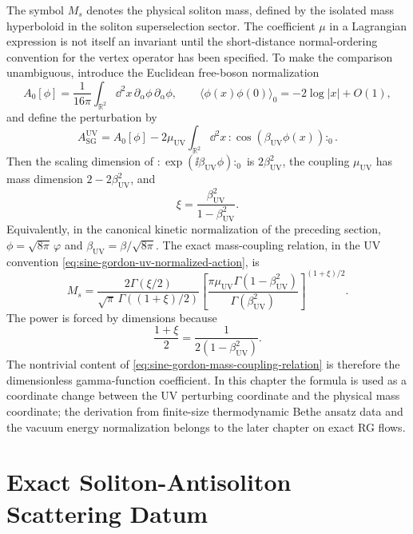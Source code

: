 The symbol \(M_s\) denotes the physical soliton mass, defined by the isolated
mass hyperboloid in the soliton superselection sector.  The coefficient
\(\mu\) in a Lagrangian expression is not itself an invariant until the
short-distance normal-ordering convention for the vertex operator has been
specified.  To make the comparison unambiguous, introduce the Euclidean
free-boson normalization
\[
  A_0[\phi]=\frac{1}{16\pi}\int_{\mathbb R^2} \dd^2x\,
  \partial_\alpha\phi\,\partial_\alpha\phi,
  \qquad
  \langle \phi(x)\phi(0)\rangle_0=-2\log |x|+O(1),
\]
and define the perturbation by
\begin{equation}
  A_{\mathrm{SG}}^{\mathrm{UV}}
  =
  A_0[\phi]
  -2\mu_{\mathrm{UV}}\int_{\mathbb R^2}\dd^2x\,
  :\!\cos(\beta_{\mathrm{UV}}\phi(x))\!:_{0}.
  \label{eq:sine-gordon-uv-normalized-action}
\end{equation}
Then the scaling dimension of
\(:\!\exp(\ii\beta_{\mathrm{UV}}\phi)\!:_0\) is
\(2\beta_{\mathrm{UV}}^2\), the coupling
\(\mu_{\mathrm{UV}}\) has mass dimension \(2-2\beta_{\mathrm{UV}}^2\), and
\[
  \xi=\frac{\beta_{\mathrm{UV}}^2}{1-\beta_{\mathrm{UV}}^2}.
\]
Equivalently, in the canonical kinetic normalization of the preceding section,
\(\phi=\sqrt{8\pi}\,\varphi\) and
\(\beta_{\mathrm{UV}}=\beta/\sqrt{8\pi}\).  The exact mass-coupling relation,
in the UV convention \eqref{eq:sine-gordon-uv-normalized-action}, is
\begin{equation}
  M_s
  =
  \frac{2\Gamma(\xi/2)}
       {\sqrt{\pi}\,\Gamma((1+\xi)/2)}
  \left[
    \frac{\pi\mu_{\mathrm{UV}}\Gamma(1-\beta_{\mathrm{UV}}^2)}
         {\Gamma(\beta_{\mathrm{UV}}^2)}
  \right]^{(1+\xi)/2}.
  \label{eq:sine-gordon-mass-coupling-relation}
\end{equation}
The power is forced by dimensions because
\[
  \frac{1+\xi}{2}
  =
  \frac{1}{2(1-\beta_{\mathrm{UV}}^2)}.
\]
The nontrivial content of
\eqref{eq:sine-gordon-mass-coupling-relation} is therefore the dimensionless
gamma-function coefficient.  In this chapter the formula is used as a
coordinate change between the UV perturbing coordinate and the physical mass
coordinate; the derivation from finite-size thermodynamic Bethe ansatz data and
the vacuum energy normalization belongs to the later chapter on exact RG flows.

\section{Exact Soliton-Antisoliton Scattering Datum}

